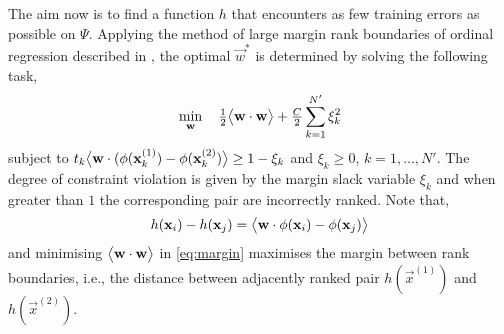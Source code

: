 The aim now is to find a function $h$ that encounters as few training errors as 
possible on $\Psi$. Applying the method of large margin rank boundaries of 
ordinal regression described in \cite{Herbrich00}, the optimal $\vec{w}^*$ is 
determined by solving the following task, 
\begin{equation}\label{eq:margin}
	\min_{\vec{w}}\quad \tfrac{1}{2}\inner{\vec{w}}{\vec{w}} + \tfrac{C}{2}\sum_{k=1}^{N'}\xi_k^2
\end{equation}
subject to $t_k\big<{\mathbf{w}}\cdot{({\mathbf{\phi}}(\mathbf{x}_k^{(1)})-{\mathbf{\phi}}(\mathbf{x}_k^{(2)})}\big>\ge 1 - \xi_k$ and $\xi_k \ge 0$, $k = 1,\ldots, N'$. The degree of constraint violation is given by the margin slack variable $\xi_k$ and when greater than $1$ the corresponding pair are incorrectly ranked. 
Note that,
\begin{equation}
	h(\mathbf{x}_i)-h(\mathbf{x}_j)=\big<{\mathbf{w}}\cdot{{\mathbf{\phi}}(\mathbf{x}_i)-{\mathbf{\phi}}(\mathbf{x}_j)}\big>
\end{equation}
and minimising $\big<{\mathbf{w}}\cdot{\mathbf{w}}\big>$ in \cref{eq:margin} maximises the margin between rank boundaries, i.e., the distance between adjacently ranked pair $h(\vec{x}^{(1)})$ and $h(\vec{x}^{(2)})$.




